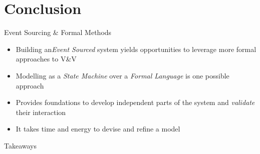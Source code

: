 \part{Conclusion}

\begin{frame}[fragile]{Event Sourcing \& Formal Methods}
  \begin{itemize}[<+->]
  \item Building an\emph{Event Sourced} system yields opportunities to leverage more formal approaches to V\&V
  \item Modelling as a \emph{State Machine} over a \emph{Formal Language} is one possible approach
  \item Provides foundations to develop independent parts of the system and \emph{validate} their interaction
  \item It takes time and energy to devise and refine a model
  \end{itemize}
\end{frame}

\begin{frame}[fragile]{Takeaways}
\end{frame}

